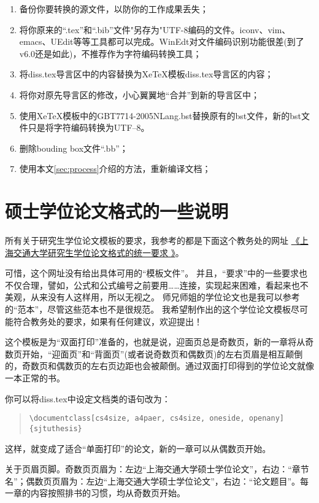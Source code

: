 \begin{enumerate}
\item 备份你要转换的源文件，以防你的工作成果丢失；
\item 将你原来的``.tex''和``.bib''文件"另存为"UTF-8编码的文件。iconv、vim、emacs、UEdit等等工具都可以完成。WinEdt对文件编码识别功能很差(到了v6.0还是如此)，不推荐作为字符编码转换工具；
\item 将diss.tex导言区中的内容替换为XeTeX模板diss.tex导言区的内容；
\item 将你对原先导言区的修改，小心翼翼地``合并''到新的导言区中；
\item 使用XeTeX模板中的GBT7714-2005NLang.bst替换原有的bst文件，新的bst文件只是将字符编码转换为UTF--8。
\item 删除bouding box文件``.bb''；
\item 使用本文\ref{sec:process}介绍的方法，重新编译文档；
\end{enumerate}

\section{硕士学位论文格式的一些说明}
\label{sec:thesisformat}

所有关于研究生学位论文模板的要求，我参考的都是下面这个教务处的网址
\href{http://www.gs.sjtu.edu.cn/policy/fileShow.ahtml?id=130}{《上海交通大学研究生学位论文格式的统一要求 》}。

可惜，这个网址没有给出具体可用的“模板文件”。
并且，``要求''中的一些要求也不仅合理，譬如，公式和公式编号之前要用……连接，实现起来困难，看起来也不美观，从来没有人这样用，所以无视之。
师兄师姐的学位论文也是我可以参考的“范本”，尽管这些范本也不是很规范。
我希望制作出的这个学位论文模板尽可能符合教务处的要求，如果有任何建议，欢迎提出！

这个模板是为``双面打印''准备的，也就是说，迎面页总是奇数页，新的一章将从奇数页开始，``迎面页''和``背面页''(或者说奇数页和偶数页)的左右页眉是相互颠倒的，奇数页和偶数页的左右页边距也会被颠倒。通过双面打印得到的学位论文就像一本正常的书。

你可以将diss.tex中设定文档类的语句改为：

\begin{quote}
  {\scriptsize\verb+\documentclass[cs4size, a4paer, cs4size, oneside, openany]{sjtuthesis}+}
\end{quote}

这样，就变成了适合“单面打印”的论文，新的一章可以从偶数页开始。

关于页眉页脚。奇数页页眉为：左边``上海交通大学硕士学位论文''，右边：``章节名''；偶数页页眉为：左边``上海交通大学硕士学位论文''，右边：``论文题目''。每一章的内容按照排书的习惯，均从奇数页开始。

